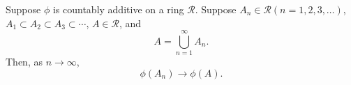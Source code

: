 \begin{thm}
    \label{thm:11.3}
    Suppose $\phi$ is countably additive on a ring $\mathscr{R}$.
    Suppose $A_n \in \mathscr{R} (n = 1,2,3,\dots)$,
    $A_1 \subset A_2 \subset A_3 \subset \cdots$, $A \in \mathscr{R}$, and 
    \begin{equation*}
        A = \bigcup_{n=1}^{\infty} A_n .
    \end{equation*}
    Then, as $n \rightarrow \infty$,
    \begin{equation*}
        \phi(A_n) \rightarrow \phi(A) .
    \end{equation*}
\end{thm}

